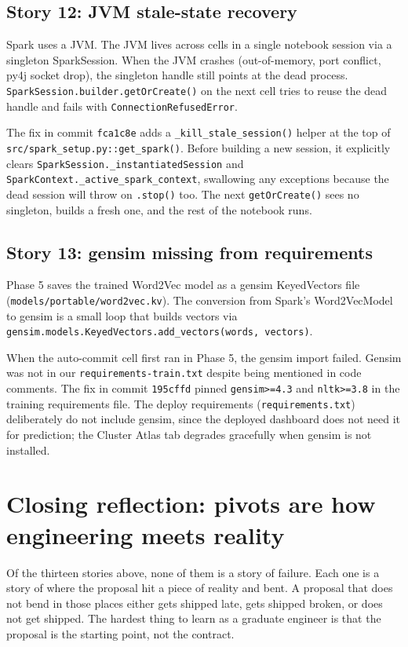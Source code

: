 \documentclass[11pt,letterpaper]{book}
\begin{document}
\subsection*{Story 12: JVM stale-state recovery}

Spark uses a JVM. The JVM lives across cells in a single notebook session via a singleton SparkSession. When the JVM crashes (out-of-memory, port conflict, py4j socket drop), the singleton handle still points at the dead process. \texttt{SparkSession.builder.getOrCreate()} on the next cell tries to reuse the dead handle and fails with \texttt{ConnectionRefusedError}.

The fix in commit \texttt{fca1c8e} adds a \texttt{\_kill\_stale\_session()} helper at the top of \texttt{src/spark\_setup.py::get\_spark()}. Before building a new session, it explicitly clears \texttt{SparkSession.\_instantiatedSession} and \texttt{SparkContext.\_active\_spark\_context}, swallowing any exceptions because the dead session will throw on \texttt{.stop()} too. The next \texttt{getOrCreate()} sees no singleton, builds a fresh one, and the rest of the notebook runs.

\subsection*{Story 13: gensim missing from requirements}

Phase 5 saves the trained Word2Vec model as a gensim KeyedVectors file (\texttt{models/portable/word2vec.kv}). The conversion from Spark's Word2VecModel to gensim is a small loop that builds vectors via \texttt{gensim.models.KeyedVectors.add\_vectors(words, vectors)}.

When the auto-commit cell first ran in Phase 5, the gensim import failed. Gensim was not in our \texttt{requirements-train.txt} despite being mentioned in code comments. The fix in commit \texttt{195cffd} pinned \texttt{gensim>=4.3} and \texttt{nltk>=3.8} in the training requirements file. The deploy requirements (\texttt{requirements.txt}) deliberately do not include gensim, since the deployed dashboard does not need it for prediction; the Cluster Atlas tab degrades gracefully when gensim is not installed.

\section{Closing reflection: pivots are how engineering meets reality}

Of the thirteen stories above, none of them is a story of failure. Each one is a story of where the proposal hit a piece of reality and bent. A proposal that does not bend in those places either gets shipped late, gets shipped broken, or does not get shipped. The hardest thing to learn as a graduate engineer is that the proposal is the starting point, not the contract.
\end{document}
